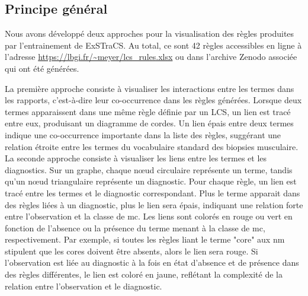 \subsection{Principe général}
Nous avons développé deux approches pour la visualisation des règles produites par l'entrainement de ExSTraCS. Au total, ce sont 42 règles accessibles en ligne à l'adresse \url{https://lbgi.fr/~meyer/lcs_rules.xlsx} ou dans l'archive Zenodo associée qui ont été générées.

La première approche consiste à visualiser les interactions entre les termes dans les rapports, c'est-à-dire leur co-occurrence dans les règles générées. Lorsque deux termes apparaissent dans une même règle définie par un LCS, un lien est tracé entre eux, produisant un diagramme de cordes. Un lien épais entre deux termes indique une co-occurrence importante dans la liste des règles, suggérant une relation étroite entre les termes du vocabulaire standard des biopsies musculaire.
La seconde approche consiste à visualiser les liens entre les termes et les diagnostics. Sur un graphe, chaque nœud circulaire représente un terme, tandis qu'un nœud triangulaire représente un diagnostic. Pour chaque règle, un lien est tracé entre les termes et le diagnostic correspondant. Plus le terme apparait dans des règles liées à un diagnostic, plus le lien sera épais, indiquant une relation forte entre l'observation et la classe de \gls{mc}. Les liens sont colorés en rouge ou vert en fonction de l'absence ou la présence du terme menant à la classe de \gls{mc}, respectivement. Par exemple, si toutes les règles liant le terme "core" aux \gls{nm} stipulent que les cores doivent être absents, alors le lien sera rouge. Si l'observation est liée au diagnostic à la fois en état d'absence et de présence dans des règles différentes, le lien est coloré en jaune, reflétant la complexité de la relation entre l'observation et le diagnostic.
